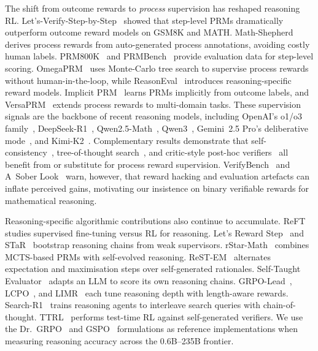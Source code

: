 The shift from outcome rewards to \emph{process} supervision has reshaped
reasoning RL. Let's-Verify-Step-by-Step~\cite{lightman2024stepbystep} showed
that step-level PRMs dramatically outperform outcome reward models on GSM8K
and MATH. Math-Shepherd~\cite{wang2024mathshepherd} derives process rewards
from auto-generated process annotations, avoiding costly human labels.
PRM800K~\cite{uesato2022prm800k} and PRMBench~\cite{song2024prmbench} provide
evaluation data for step-level scoring. OmegaPRM~\cite{luo2024omegaprm} uses
Monte-Carlo tree search to supervise process rewards without human-in-the-loop,
while ReasonEval~\cite{xia2024reasoneval} introduces reasoning-specific reward
models. Implicit PRM~\cite{yuan2024implicitprm} learns PRMs implicitly from
outcome labels, and VersaPRM~\cite{yuan2025versaprm} extends process rewards
to multi-domain tasks. These supervision signals are the backbone of recent
reasoning models, including OpenAI's o1/o3 family~\cite{openai2024o1,
openai2025o3}, DeepSeek-R1~\cite{guo2025deepseekr1, guo2025deepseekr1nature},
Qwen2.5-Math~\cite{yang2024qwen25math}, Qwen3~\cite{qwen2025qwen3},
Gemini~2.5 Pro's deliberative mode~\cite{google2025gemini25}, and
Kimi-K2~\cite{team2025kimik2}. Complementary results demonstrate that
self-consistency~\cite{wang2023selfconsistency}, tree-of-thought
search~\cite{yao2024tot}, and critic-style post-hoc
verifiers~\cite{mcaleese2024criticgpt} all benefit from or substitute for
process reward supervision. VerifyBench~\cite{zhang2025verifybench} and
A~Sober Look~\cite{hochlehnert2025sober} warn, however, that reward hacking
and evaluation artefacts can inflate perceived gains, motivating our
insistence on binary verifiable rewards for mathematical reasoning.

Reasoning-specific algorithmic contributions also continue to accumulate.
ReFT~\cite{luong2024reft} studies supervised fine-tuning versus RL for
reasoning. Let's Reward Step~\cite{zhang2025rewardstep} and
STaR~\cite{zelikman2022star} bootstrap reasoning chains from weak
supervisors. rStar-Math~\cite{guan2025rstarmath} combines MCTS-based PRMs
with self-evolved reasoning. ReST-EM~\cite{singh2024restem} alternates
expectation and maximisation steps over self-generated rationales.
Self-Taught Evaluator~\cite{wang2024stevaluator} adapts an LLM to score its
own reasoning chains. GRPO-Lead~\cite{lu2025grpolead}, LCPO~\cite{lu2025lcpo},
and LIMR~\cite{li2025limr} each tune reasoning depth with length-aware
rewards. Search-R1~\cite{jin2025searchr1} trains reasoning agents to
interleave search queries with chain-of-thought. TTRL~\cite{pu2025ttrl}
performs test-time RL against self-generated verifiers. We use the
Dr.~GRPO~\cite{liu2025drgrpo} and GSPO~\cite{qwen2025gspo} formulations as
reference implementations when measuring reasoning accuracy across the
0.6B--235B frontier.

